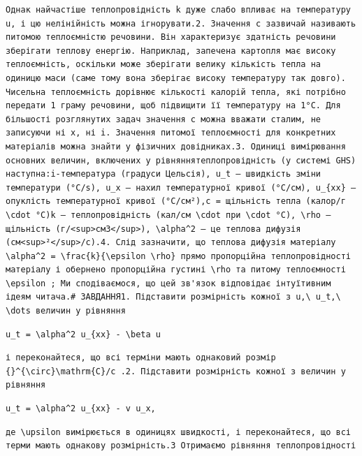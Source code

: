 \documentclass[
  ukrainian,
]{article}
\begin{document}
\begin{verbatim}
Однак найчастіше теплопровідність k дуже слабо впливає на температуру u, і цю нелінійність можна ігнорувати.2. Значення c зазвичай називають питомою теплоємністю речовини. Він характеризує здатність речовини зберігати теплову енергію. Наприклад, запечена картопля має високу теплоємність, оскільки може зберігати велику кількість тепла на одиницю маси (саме тому вона зберігає високу температуру так довго). Чисельна теплоємність дорівнює кількості калорій тепла, які потрібно передати 1 граму речовини, щоб підвищити її температуру на 1°C. Для більшості розглянутих задач значення c можна вважати сталим, не записуючи ні x, ні i. Значення питомої теплоємності для конкретних матеріалів можна знайти у фізичних довідниках.3. Одиниці вимірювання основних величин, включених у рівняннятеплопровідність (у системі GHS) наступна:i-температура (градуси Цельсія), u_t — швидкість зміни температури (°C/s), u_x — нахил температурної кривої (°C/см), u_{xx} — опуклість температурної кривої (°C/см²),c = щільність тепла (калор/г \cdot °C)k — теплопровідність (кал/см \cdot при \cdot °C), \rho — щільність (г/<sup>см3</sup>), \alpha^2 — це теплова дифузія (см<sup>²</sup>/с).4. Слід зазначити, що теплова дифузія матеріалу \alpha^2 = \frac{k}{\epsilon \rho} прямо пропорційна теплопровідності матеріалу і обернено пропорційна густині \rho та питому теплоємності \epsilon ; Ми сподіваємося, що цей зв'язок відповідає інтуїтивним ідеям читача.# ЗАВДАННЯ1. Підставити розмірність кожної з u,\ u_t,\ \dots величин у рівняння
\end{verbatim}

\begin{verbatim}
u_t = \alpha^2 u_{xx} - \beta u
\end{verbatim}

\begin{verbatim}
і переконайтеся, що всі терміни мають однаковий розмір {}^{\circ}\mathrm{C}/c .2. Підставити розмірність кожної з величин у рівняння
\end{verbatim}

\begin{verbatim}
u_t = \alpha^2 u_{xx} - v u_x,
\end{verbatim}

\begin{verbatim}
де \upsilon вимірюється в одиницях швидкості, і переконайтеся, що всі терми мають однакову розмірність.3 Отримаємо рівняння теплопровідності
\end{verbatim}
\end{document}
